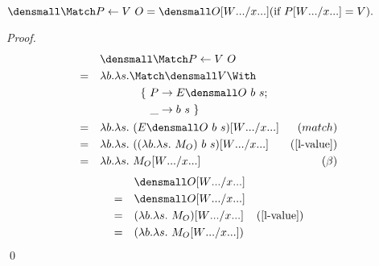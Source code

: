 \begin{theorem}[] \\
    $ \den{\Match P \gets V ~ O} = \den{O\subst{\many{x}}{\many{W}}} (\text{if } P\subst{\many{x}}{\many{W}} = V).$
    \begin{proof}
        \begin{align*}
            &\quad \den{\Match P \gets V ~ O}  \\
            =&\quad \lambda b. \lambda s.
            \begin{aligned}[t]
              &\Match \den{V} \With \\
              &\quad
              \begin{aligned}[t]
                \{~
                P &\to E\den{O}~b~s; \\
                \_ &\to b~s
                ~\}
              \end{aligned}
            \end{aligned}  \\
            =&\quad  \lambda b. \lambda s.~(E\den{O}~b~s)\subst{\many{x}}{\many{W}}  & (match) \\
            =&\quad  \lambda b. \lambda s.~((\lambda b. \lambda s. ~M_O)~b~s)\subst{\many{x}}{\many{W}}  & (\cref{l-value}) \\
            =&\quad  \lambda b. \lambda s.~M_O\subst{\many{x}}{\many{W}}  & (\beta)
        \end{align*}
        \begin{align*}
            &\quad \den{O\subst{\many{x}}{\many{W}}}  \\
            =& \quad \den{O}\subst{\many{x}}{\many{W}} \\
            =& \quad (\lambda b. \lambda s. ~M_O)\subst{\many{x}}{\many{W}} & (\cref{l-value}) \\
            =& \quad (\lambda b. \lambda s. ~M_O\subst{\many{x}}{\many{W}}) 
        \end{align*}
        \qed
    \end{proof}
\end{theorem}
